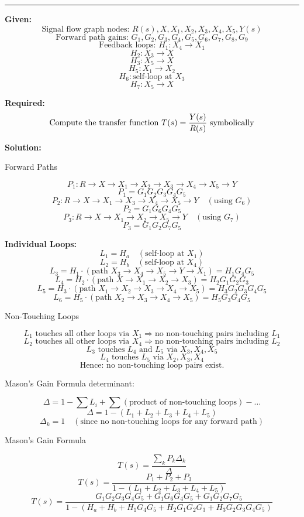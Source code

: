 \noindent\rule{\textwidth}{1pt}

\textbf{Given:}
\[
\text{Signal flow graph nodes: } R(s), X, X_1, X_2, X_3, X_4, X_5, Y(s)
\]
\[
\text{Forward path gains: } G_1, G_2, G_3, G_4, G_5, G_6, G_7, G_8, G_9
\]
\[
\text{Feedback loops: } H_1: X_4 \to X_1
\]
\[
H_2: X_3 \to X
\]
\[
H_3: X_5 \to X
\]
\[
H_5: X_1 \to X_2
\]
\[
H_6: \text{self-loop at } X_3
\]
\[
H_7: X_5 \to X
\]

\textbf{Required:}
\[
\text{Compute the transfer function } T(s) = \frac{Y(s)}{R(s)} \text{ symbolically} \\[1mm]
\]

\textbf{Solution:}

Forward Paths

\[
P_1: R \to X \to X_1 \to X_2 \to X_3 \to X_4 \to X_5 \to Y
\]
\[
P_1 = G_1 G_2 G_3 G_4 G_5
\]
\[
P_2: R \to X \to X_1 \to X_3 \to X_4 \to X_5 \to Y \quad (\text{using } G_6)
\]
\[
P_2 = G_1 G_6 G_4 G_5
\]
\[
P_3: R \to X \to X_1 \to X_2 \to X_5 \to Y \quad (\text{using } G_7)
\]
\[
P_3 = G_1 G_2 G_7 G_5
\]

\textbf{Individual Loops:}
\[
L_1 = H_a \quad (\text{self-loop at } X_1)
\]
\[
L_2 = H_b \quad (\text{self-loop at } X_4)
\]
\[
L_3 = H_1 \cdot (\text{path } X_3 \to X_4 \to X_5 \to Y \to X_1) = H_1 G_4 G_5
\]
\[
L_4 = H_2 \cdot (\text{path } X \to X_1 \to X_2 \to X_3) = H_2 G_1 G_2 G_3
\]
\[
L_5 = H_3 \cdot (\text{path } X_1 \to X_2 \to X_3 \to X_4 \to X_5) = H_3 G_2 G_3 G_4 G_5
\]
\[
L_6 = H_5 \cdot (\text{path } X_2 \to X_3 \to X_4 \to X_5) = H_5 G_3 G_4 G_5
\]

\newpage
Non-Touching Loops

\[
L_1 \text{ touches all other loops via } X_1 \Rightarrow \text{no non-touching pairs including } L_1
\]
\[
L_2 \text{ touches all other loops via } X_4 \Rightarrow \text{no non-touching pairs including } L_2
\]
\[
L_3 \text{ touches } L_4 \text{ and } L_5 \text{ via } X_3,X_4,X_5
\]
\[
L_4 \text{ touches } L_5 \text{ via } X_2,X_3,X_4
\]
\[
\text{Hence: no non-touching loop pairs exist.}
\]

Mason's Gain Formula determinant:

\[
\Delta = 1 - \sum L_i + \sum (\text{product of non-touching loops}) - \dots
\]
\[
\Delta = 1 - (L_1 + L_2 + L_3 + L_4 + L_5)
\]
\[
\Delta_k = 1 \quad (\text{since no non-touching loops for any forward path})
\]

Mason's Gain Formula

\[
T(s) = \frac{\sum_k P_k \Delta_k}{\Delta}
\]
\[
T(s) = \frac{P_1 + P_2 + P_3}{1 - (L_1 + L_2 + L_3 + L_4 + L_5)}
\]
\[
\boxed{
T(s) = \frac{G_1 G_2 G_3 G_4 G_5 + G_1 G_6 G_4 G_5 + G_1 G_2 G_7 G_5}{1 - (H_a + H_b + H_1 G_4 G_5 + H_2 G_1 G_2 G_3 + H_3 G_2 G_3 G_4 G_5)}
}
\]